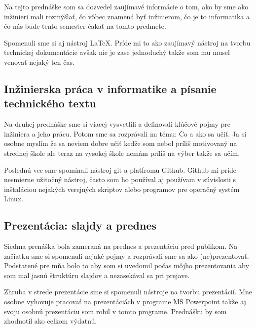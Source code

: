 \documentclass[10pt,oneside,slovak,a4paper]{article}
\begin{document}
Na tejto prednáške som sa dozvedel zaujímavé informácie o tom, ako by sme ako inžinieri mali rozmýšlať, čo vôbec znamená byť inžinierom, čo je to informatika a čo nás bude tento semester čakať na tomto predmete.

Spomenuli sme si aj nástroj LaTeX. Príde mi to ako zaujímavý nástroj na tvorbu technickej dokumentácie avšak nie je zase jednoduchý takže som mu musel venovať nejaký ten čas.


\subsection{Inžinierska práca v informatike a písanie technického textu}

Na druhej prednáške sme si viacej vysvetlili a definovali kľúčové pojmy pre inžiniera a jeho prácu. Potom sme sa rozprávali na tému: Čo a ako sa učiť. Ja si osobne myslím že sa neviem dobre učiť kedže som nebol príliš motivovaný na strednej škole ale teraz na vysokej škole nemám príliš na výber takže sa učím.

Poslednú vec sme spomínali nástroj git a platfromu Github. Github mi príde nesmierne užitočný nástroj, často som ho používal aj používam v súvislosti s inštaláciou nejakých verejných skriptov alebo programov pre operačný systém Linux.

\subsection{Prezentácia: slajdy a prednes}

Siedma prenáška bola zameraná na prednes a prezentáciu pred publikom. Na začiatku sme si spomenuli nejaké pojmy a rozprávali sme sa ako (ne)prezentovať. Podstatené pre mňa bolo to aby som si uvedomil počas môjho prezentovania aby som mal jasnú štruktúru slajdov a nezasekával sa pri prejave.

Zhruba v strede prezentácie sme si spomenuli  nástroje na tvorbu prezentácií. Mne osobne vyhovuje pracovať na prezentáciách v programe MS Powerpoint takže aj svoju osobnú prezentáciu som robil v tomto programe. Prednášku by som zhodnotil ako celkom výdatnú.



\end{document}
